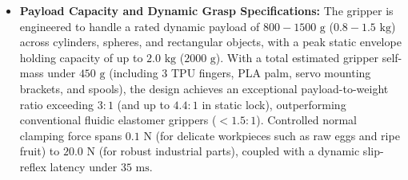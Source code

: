 \documentclass[12pt,a4paper]{report}
\begin{document}
\begin{itemize}
    \item \textbf{Payload Capacity and Dynamic Grasp Specifications:} The gripper is engineered to handle a rated dynamic payload of $800 - 1500\text{ g}$ ($0.8 - 1.5\text{ kg}$) across cylinders, spheres, and rectangular objects, with a peak static envelope holding capacity of up to $2.0\text{ kg}$ ($2000\text{ g}$). With a total estimated gripper self-mass under $450\text{ g}$ (including 3 TPU fingers, PLA palm, servo mounting brackets, and spools), the design achieves an exceptional payload-to-weight ratio exceeding $3:1$ (and up to $4.4:1$ in static lock), outperforming conventional fluidic elastomer grippers ($<1.5:1$). Controlled normal clamping force spans $0.1\text{ N}$ (for delicate workpieces such as raw eggs and ripe fruit) to $20.0\text{ N}$ (for robust industrial parts), coupled with a dynamic slip-reflex latency under $35\text{ ms}$.
\end{itemize}
\end{document}

